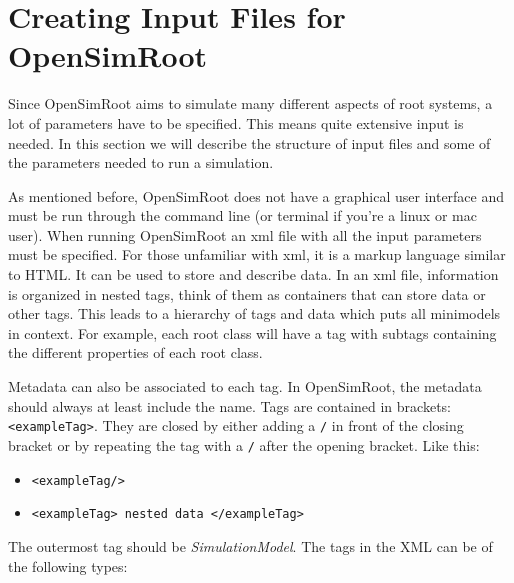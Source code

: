 \documentclass{article}
\begin{document}
\section{Creating Input Files for OpenSimRoot}\label{Input}

\noindent Since OpenSimRoot aims to simulate many different aspects of root systems, a lot of parameters have to be specified. This means quite extensive input is needed. In this section we will describe the structure of input files and some of the parameters needed to run a simulation. \newline

\noindent As mentioned before, OpenSimRoot does not have a graphical user interface and must be run through the command line (or terminal if you're a linux or mac user). When running OpenSimRoot an xml file with all the input parameters must be specified. For those unfamiliar with xml, it is a markup language similar to HTML. It can be used to store and describe data. In an xml file, information is organized in nested tags, think of them as containers that can store data or other tags. This leads to a hierarchy of tags and data which puts all minimodels in context. For example, each root class will have a tag with subtags containing the different properties of each root class. \newline

\noindent Metadata can also be associated to each tag. In OpenSimRoot, the metadata should always at least include the name. Tags are contained in brackets: \verb| <exampleTag>|. They are closed by either adding a \verb|/| in front of the closing bracket or by repeating the tag with a \verb|/| after the opening bracket. Like this:
\begin{itemize}
\item \verb|<exampleTag/>| 
\item \verb|<exampleTag> nested data </exampleTag>|
\end{itemize} 

\noindent The outermost tag should be \textit{SimulationModel}. The tags in the XML can be of the following types:
\end{document}
